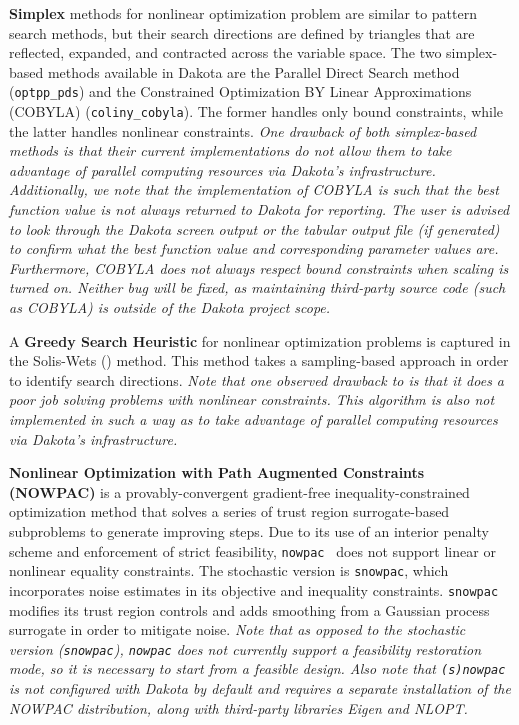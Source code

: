 {\bf Simplex} methods for nonlinear optimization problem are similar
to pattern search methods, but their search directions are defined by
triangles that are reflected, expanded, and contracted across the
variable space.  The two simplex-based methods available in Dakota are
the Parallel Direct Search method~\cite{Den94b} (\texttt{optpp\_pds})
and the Constrained Optimization BY Linear Approximations (COBYLA)
(\texttt{coliny\_cobyla}).  The former handles only bound constraints,
while the latter handles nonlinear constraints.  \emph{One drawback of
  both simplex-based methods is that their current implementations do
  not allow them to take advantage of parallel computing resources via
  Dakota's infrastructure.  Additionally, we note that the
  implementation of COBYLA is such that the best function value is not
  always returned to Dakota for reporting.  The user is advised to
  look through the Dakota screen output or the tabular output file (if
  generated) to confirm what the best function value and corresponding
  parameter values are.  Furthermore, COBYLA does not always respect
  bound constraints when scaling is turned on.  Neither bug will be
  fixed, as maintaining third-party source code (such as COBYLA) is
  outside of the Dakota project scope.}

A {\bf Greedy Search Heuristic} for nonlinear optimization problems is
captured in the Solis-Wets () method.
This method takes a sampling-based approach in order to identify
search directions.  \emph{Note that one observed drawback to
   is that it does a poor job solving
  problems with nonlinear constraints.  This algorithm is also not
  implemented in such a way as to take advantage of parallel computing
  resources via Dakota's infrastructure.}

{\bf Nonlinear Optimization with Path Augmented Constraints (NOWPAC)} 
is a provably-convergent gradient-free inequality-constrained 
optimization method that solves a series of trust region 
surrogate-based subproblems to generate improving steps. Due to its 
use of an interior penalty scheme and enforcement of strict 
feasibility, \texttt{nowpac}~\cite{Augustin-preprint-nowpac} does not 
support linear or nonlinear equality constraints. The stochastic 
version is \texttt{snowpac}, which incorporates noise estimates in its 
objective and inequality constraints. \texttt{snowpac} modifies its 
trust region controls and adds smoothing from a Gaussian process 
surrogate in order to mitigate noise. \emph{Note that as opposed to 
the stochastic version (\texttt{snowpac}), \texttt{nowpac} does not 
currently support a feasibility restoration mode, so it is necessary 
to start from a feasible design. Also note that \texttt{(s)nowpac} is 
not configured with Dakota by default and requires a separate 
installation of the NOWPAC distribution, along with third-party 
libraries Eigen and NLOPT.}


